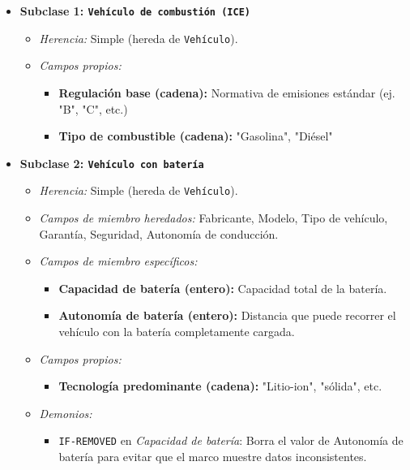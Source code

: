 \documentclass[11pt, a4paper]{article}
\newenvironment{problem}[1][Cuestión]{
	\vspace{0.5cm}
	\noindent{\Large\bfseries #1} \par\vspace{0.5cm}
}{
	\vspace{0.5cm}
}
\begin{document}
\begin{problem}[Problema 1 (40 \%)]
\begin{enumerate}[label=\alph*)]
{\begin{itemize}
					\item \textbf{Subclase 1: \texttt{Vehículo de combustión (ICE)}}
						\begin{itemize}
							\item \textit{Herencia:} Simple (hereda de \texttt{Vehículo}).
							\item \textit{Campos propios:} 
								\begin{itemize}
									\item \textbf{Regulación base (cadena):} Normativa de emisiones estándar (ej. "B", "C", etc.)
									\item \textbf{Tipo de combustible (cadena):} "Gasolina", "Diésel"
								\end{itemize}
						\end{itemize}

					\item \textbf{Subclase 2: \texttt{Vehículo con batería}}
						\begin{itemize}
							\item \textit{Herencia:} Simple (hereda de \texttt{Vehículo}).
							\item \textit{Campos de miembro heredados:} Fabricante, Modelo, Tipo de vehículo, Garantía, Seguridad, Autonomía de conducción.
							\item \textit{Campos de miembro específicos:} 
								\begin{itemize}
									\item \textbf{Capacidad de batería (entero):} Capacidad total de la batería.
									\item \textbf{Autonomía de batería (entero):} Distancia que puede recorrer el vehículo con la batería completamente cargada.
								\end{itemize}
							\item \textit{Campos propios:} 
								\begin{itemize}
									\item \textbf{Tecnología predominante (cadena):} "Litio-ion", "sólida", etc.
								\end{itemize}
							\item \textit{Demonios:}
								\begin{itemize}
									\item \texttt{IF-REMOVED} en \textit{Capacidad de batería}: Borra el valor de Autonomía de batería para evitar que el marco muestre datos inconsistentes.
								\end{itemize}
						\end{itemize}


\end{itemize}}
\end{enumerate}
\end{problem}
\end{document}
